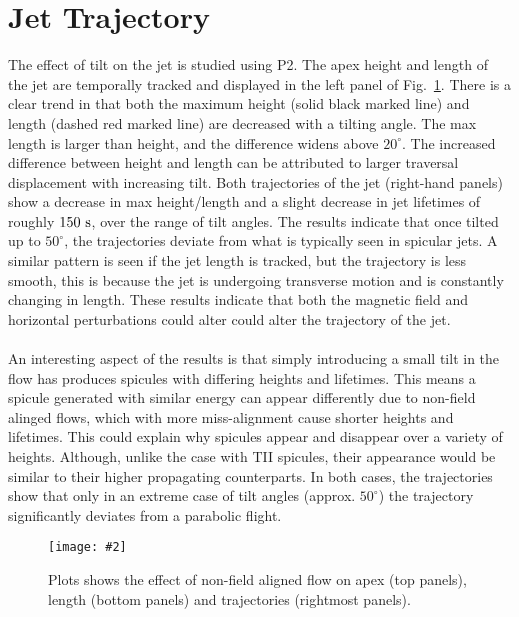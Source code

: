 \documentclass[12pt]{ociamthesis}
\newcommand{\mfig}[4]{
  \begin{figure}
  \begin{center}
  \texttt{[image: \#2]}
  \caption{#3}
  \label{#4}
  \end{center}
  \end{figure}}
\newcommand{\np}{\\ \\}
\begin{document}
\section{Jet Trajectory}
\label{sec:j_traj_t}
The effect of tilt on the jet is studied using P2. The apex height and length of the jet are temporally tracked and displayed in the left panel of Fig.~\ref{tilt_effect_traj}. There is a clear trend in that both the maximum height (solid black marked line) and length (dashed red marked line) are decreased with a tilting angle. The max length is larger than height, and the difference widens above $20^{\circ}$. The increased difference between height and length can be attributed to larger traversal displacement with increasing tilt. Both trajectories of the jet (right-hand panels) show a decrease in max height/length and a slight decrease in jet lifetimes of roughly $150~\rm{s}$, over the range of tilt angles. The results indicate that once tilted up to $50^{\circ}$, the trajectories deviate from what is typically seen in spicular jets. A similar pattern is seen if the jet length is tracked, but the trajectory is less smooth, this is because the jet is undergoing transverse motion and is constantly changing in length. These results indicate that both the magnetic field and horizontal perturbations could alter could alter the trajectory of the jet. \np 
%
An interesting aspect of the results is that simply introducing a small tilt in the flow has produces spicules with differing heights and lifetimes. This means a spicule generated with similar energy can appear differently due to non-field alinged flows, which with more miss-alignment cause shorter heights and lifetimes. This could explain why spicules appear and disappear over a variety of heights. Although, unlike the case with TII spicules, their appearance would be similar to their higher propagating counterparts. In both cases, the trajectories show that only in an extreme case of tilt angles (approx. $50^{\circ}$) the trajectory significantly deviates from a parabolic flight.  
%
\mfig{1}{figures/combine_L_h_comp.png}{Plots shows the effect of non-field aligned flow on apex (top panels), length (bottom panels) and trajectories (rightmost panels).}{tilt_effect_traj}
\end{document}
